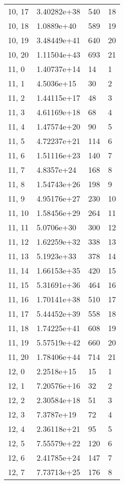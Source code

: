 \begin{table}
\begin{tabular}{llll}
10, 17 &  3.40282e+38 &  540 &    18 \\
10, 18 &   1.0889e+40 &  589 &    19 \\
10, 19 &  3.48449e+41 &  640 &    20 \\
10, 20 &  1.11504e+43 &  693 &    21 \\
11, 0  &  1.40737e+14 &   14 &     1 \\
11, 1  &   4.5036e+15 &   30 &     2 \\
11, 2  &  1.44115e+17 &   48 &     3 \\
11, 3  &  4.61169e+18 &   68 &     4 \\
11, 4  &  1.47574e+20 &   90 &     5 \\
11, 5  &  4.72237e+21 &  114 &     6 \\
11, 6  &  1.51116e+23 &  140 &     7 \\
11, 7  &   4.8357e+24 &  168 &     8 \\
11, 8  &  1.54743e+26 &  198 &     9 \\
11, 9  &  4.95176e+27 &  230 &    10 \\
11, 10 &  1.58456e+29 &  264 &    11 \\
11, 11 &   5.0706e+30 &  300 &    12 \\
11, 12 &  1.62259e+32 &  338 &    13 \\
11, 13 &   5.1923e+33 &  378 &    14 \\
11, 14 &  1.66153e+35 &  420 &    15 \\
11, 15 &  5.31691e+36 &  464 &    16 \\
11, 16 &  1.70141e+38 &  510 &    17 \\
11, 17 &  5.44452e+39 &  558 &    18 \\
11, 18 &  1.74225e+41 &  608 &    19 \\
11, 19 &  5.57519e+42 &  660 &    20 \\
11, 20 &  1.78406e+44 &  714 &    21 \\
12, 0  &   2.2518e+15 &   15 &     1 \\
12, 1  &  7.20576e+16 &   32 &     2 \\
12, 2  &  2.30584e+18 &   51 &     3 \\
12, 3  &   7.3787e+19 &   72 &     4 \\
12, 4  &  2.36118e+21 &   95 &     5 \\
12, 5  &  7.55579e+22 &  120 &     6 \\
12, 6  &  2.41785e+24 &  147 &     7 \\
12, 7  &  7.73713e+25 &  176 &     8 \\

\end{tabular}
\end{table}
